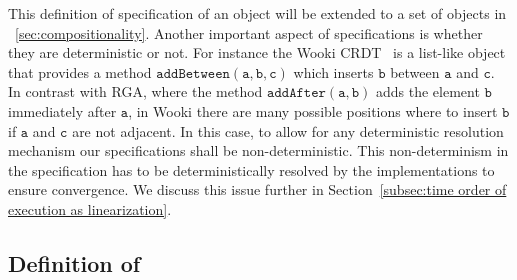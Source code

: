 This definition of specification of an object will be extended to a
set of objects in \sectionautorefname~\ref{sec:compositionality}.
%
Another important aspect of specifications is whether they are
deterministic or not.
%
For instance the Wooki CRDT~\cite{DBLP:conf/icdcs/PreguicaMSL09} is a
list-like object that provides a method $\mathtt{addBetween(a, b, c)}$
which inserts $\mathtt{b}$ between $\mathtt{a}$ and $\mathtt{c}$.
%
In contrast with RGA, where the method $\mathtt{addAfter(a, b)}$
adds the element $\mathtt{b}$ immediately after $\mathtt{a}$, in Wooki
there are many possible positions where to insert $\mathtt{b}$ if $\mathtt{a}$ and $\mathtt{c}$ are not
adjacent.
%
In this case, to allow for any deterministic resolution mechanism our
specifications shall be non-deterministic.
%
This non-determinism in the specification has to be deterministically
resolved by the implementations to ensure convergence.
We discuss this issue further in Section~\ref{subsec:time order of execution as linearization}.
%



\subsection{Definition of \CRDTLin{}}
\label{subsec:definition of distributed linearizability}

